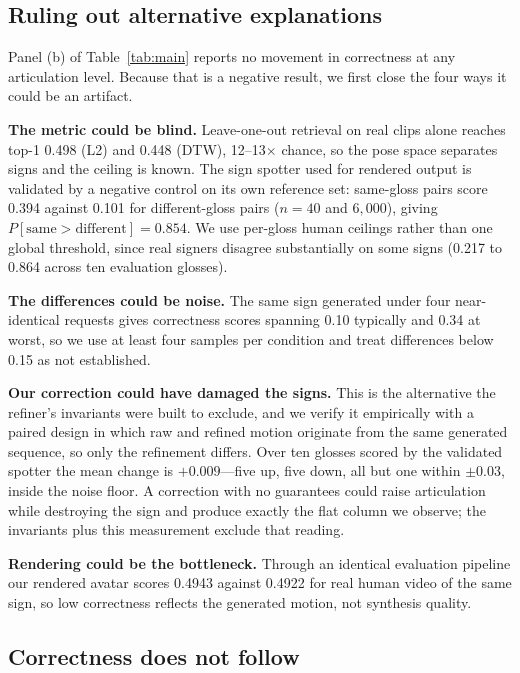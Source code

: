 \documentclass{article}
\begin{document}
\subsection{Ruling out alternative explanations}
\label{ssec:ruleout}

Panel (b) of Table~\ref{tab:main} reports no movement in correctness at any
articulation level. Because that is a negative result, we first close the four
ways it could be an artifact.

\noindent\textbf{The metric could be blind.} Leave-one-out retrieval on real
clips alone reaches top-1 0.498 (L2) and 0.448 (DTW), 12--13$\times$ chance, so
the pose space separates signs and the ceiling is known. The sign spotter used for
rendered output is validated by a negative control on its own reference set:
same-gloss pairs score 0.394 against 0.101 for different-gloss pairs ($n = 40$ and
$6{,}000$), giving $P[\text{same} > \text{different}] = 0.854$. We use per-gloss
human ceilings rather than one global threshold, since real signers disagree
substantially on some signs (0.217 to 0.864 across ten evaluation glosses).

\noindent\textbf{The differences could be noise.} The same sign generated under
four near-identical requests gives correctness scores spanning 0.10 typically and
0.34 at worst, so we use at least four samples per condition and treat differences
below 0.15 as not established.

\noindent\textbf{Our correction could have damaged the signs.} This is the
alternative the refiner's invariants were built to exclude, and we verify it
empirically with a paired design in which raw and refined motion originate from
the same generated sequence, so only the refinement differs. Over ten glosses
scored by the validated spotter the mean change is $+0.009$---five up, five down,
all but one within $\pm 0.03$, inside the noise floor. A correction with no
guarantees could raise articulation while destroying the sign and produce exactly
the flat column we observe; the invariants plus this measurement exclude that
reading.

\noindent\textbf{Rendering could be the bottleneck.} Through an identical
evaluation pipeline our rendered avatar scores 0.4943 against 0.4922 for real
human video of the same sign, so low correctness reflects the generated motion,
not synthesis quality.

\subsection{Correctness does not follow}
\label{ssec:results}
\end{document}
